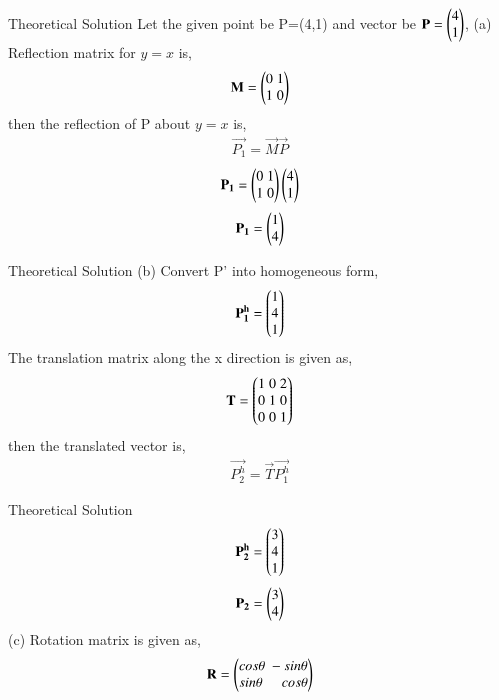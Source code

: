\documentclass{beamer}
\begin{document}
	
\begin{frame}{Theoretical Solution}
	Let the given point be P=(4,1) and vector be $\mathbf{P}=\begin{pmatrix}4\\1\end{pmatrix}$,
             (a) Reflection matrix for $y=x$ is,
             \begin{align}
                 \mathbf{M}=\begin{pmatrix}0\;1\\1\;0\end{pmatrix}
             \end{align}
             then the reflection of P about $y=x$ is,
             \begin{align}
                 \vec{P_1}=\vec{M}\vec{P}
             \end{align}
             \begin{align}
                 \mathbf{P_1}=\begin{pmatrix}0\;1\\1\;0\end{pmatrix}\begin{pmatrix}4\\1\end{pmatrix}
             \end{align}
             \begin{align}
                 \mathbf{P_1}=\begin{pmatrix}1\\4\end{pmatrix}
             \end{align}
             
\end{frame}
\begin{frame}{Theoretical Solution}
(b) Convert P' into homogeneous form,
             \begin{align}
                 \mathbf{P_1^h}=\begin{pmatrix}1\\4\\1\end{pmatrix}
             \end{align}
             The translation matrix along the x direction is given as,
             \begin{align}
                 \mathbf{T}=\begin{pmatrix}1\;0\;2\\0\;1\;0\\0\;0\;1\end{pmatrix}
             \end{align}
             then the translated vector is,
             \begin{align}
                 \vec{P_2^h}=\vec{T}\vec{P_1^h}
             \end{align}
             
             
	\end{frame}
    \begin{frame}{Theoretical Solution}
        \begin{align}
                 \mathbf{P_2^h}=\begin{pmatrix}3\\4\\1\end{pmatrix}
             \end{align}
             \begin{align}
                 \mathbf{P_2}=\begin{pmatrix}3\\4\end{pmatrix}
             \end{align}
             (c) Rotation matrix is given as,
             \begin{align}
                 \mathbf{R}=\begin{pmatrix}cos\theta\;-sin\theta\\sin\theta\;\;\;\;\;cos\theta\end{pmatrix}
             \end{align}
    \end{frame}
\end{document}

